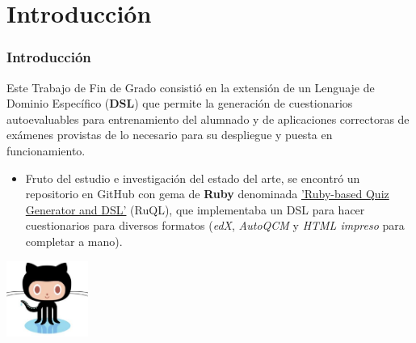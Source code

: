 \documentclass{beamer}
\begin{document}
\section{Introducción}
\begin{frame}[allowframebreaks]
  \frametitle{Introducción}
  
  \begin{center}
    Este Trabajo de Fin de Grado consistió en la extensión de un Lenguaje de Dominio Específico ({\bfseries DSL}) que permite la
    generación de cuestionarios autoevaluables para entrenamiento del alumnado y de aplicaciones correctoras de exámenes
    provistas de lo necesario para su despliegue y puesta en funcionamiento.
  \end{center}
  \framebreak
  
  \begin{itemize}
    \item Fruto del estudio e investigación del estado del arte, se encontró un repositorio en GitHub con gema de {\bfseries Ruby} denominada 
    \href{http://github.com/saasbook/ruql}{'Ruby-based Quiz Generator and DSL'} (RuQL), que implementaba un DSL para hacer cuestionarios 
    para diversos formatos (\textit{edX}, \textit{AutoQCM} y \textit{HTML impreso} para completar a mano).
  \end{itemize}
  \begin{center}
    \includegraphics[width=0.2\textwidth]{img/octocat.eps}
  \end{center}
  \framebreak
  

\end{frame}
\end{document}
